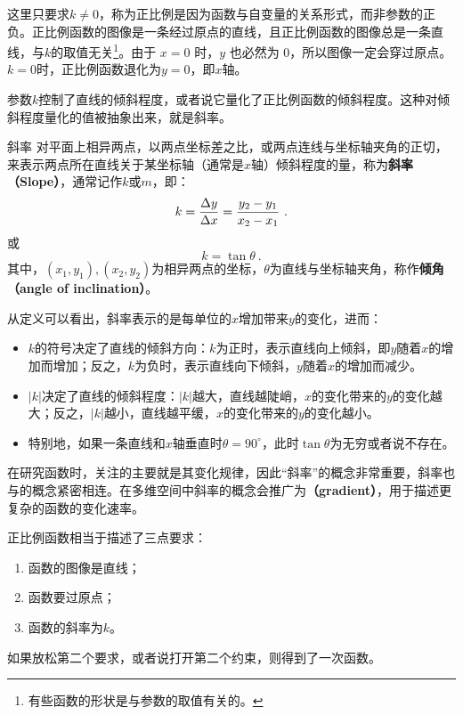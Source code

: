 这里只要求$k\neq0$，称为正比例是因为函数与自变量的关系形式，而非参数的正负。正比例函数的图像是一条经过原点的直线，且正比例函数的图像总是一条直线，与$k$的取值无关\footnote{有些函数的形状是与参数的取值有关的。}。由于 $x=0$ 时，$y$ 也必然为 $0$，所以图像一定会穿过原点。$k=0$时，正比例函数退化为$y=0$，即$x$轴。

参数$k$控制了直线的倾斜程度，或者说它量化了正比例函数的倾斜程度。这种对倾斜程度量化的值被抽象出来，就是斜率。

\begin{definition}{斜率}
对平面上相异两点，以两点坐标差之比，或两点连线与坐标轴夹角的正切，来表示两点所在直线关于某坐标轴（通常是$x$轴）倾斜程度的量，称为\textbf{斜率（Slope）}，通常记作$k$或$m$，即：
\begin{equation}
k = \frac{\Delta y}{\Delta x}={y_2-y_1\over x_2-x_1}~.
\end{equation}
或
\begin{equation}
k =\tan\theta~.
\end{equation}
其中，$(x_1,y_1),(x_2,y_2)$为相异两点的坐标，$\theta$为直线与坐标轴夹角，称作\textbf{倾角（angle of inclination）}。
\end{definition}

从定义可以看出，斜率表示的是每单位的$x$增加带来$y$的变化，进而：
\begin{itemize}
\item $k$的符号决定了直线的倾斜方向：$k$为正时，表示直线向上倾斜，即$y$随着$x$的增加而增加；反之，$k$为负时，表示直线向下倾斜，$y$随着$x$的增加而减少。
\item $|k|$决定了直线的倾斜程度：$|k|$越大，直线越陡峭，$x$的变化带来的$y$的变化越大；反之，$|k|$越小，直线越平缓，$x$的变化带来的$y$的变化越小。
\item 特别地，如果一条直线和$x$轴垂直时$\theta=90^{\circ}$，此时$\tan\theta$为无穷或者说不存在。
\end{itemize}

在研究函数时，关注的主要就是其变化规律，因此“斜率”的概念非常重要，斜率也与的概念紧密相连。在多维空间中斜率的概念会推广为\textbf{（gradient）}，用于描述更复杂的函数的变化速率。

正比例函数相当于描述了三点要求：
\begin{enumerate}
\item 函数的图像是直线；
\item 函数要过原点；
\item 函数的斜率为$k$。
\end{enumerate}
如果放松第二个要求，或者说打开第二个约束，则得到了一次函数。

